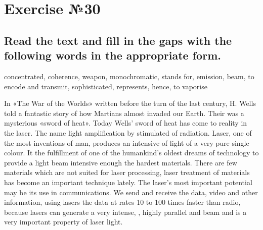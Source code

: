 \section{Exercise №30}
\subsection*{Read the text and fill in the gaps with the following words in the
      appropriate form.}
concentrated, coherence, weapon, monochromatic, stands for, emission, beam, to encode
and transmit, sophisticated, represents, hence, to vaporise

In «The War of the Worlds» written before the turn of the last century, H. Wells told
a fantastic story of how Martians almost invaded our Earth. Their 
\underline{\hspace{2cm}} was a mysterious «sword of heat». Today Wells’ sword of heat has come to
reality in the laser. The name \underline{\hspace{2cm}} light amplification by
stimulated \underline{\hspace{2cm}} of radiation. Laser, one of the most 
\underline{\hspace{2cm}} inventions of man, produces an intensive \underline{\hspace{2cm}} of light
of a very pure single colour. It \underline{\hspace{2cm}} the fulfillment of one
of the humankind’s oldest dreams of technology to provide a light beam intensive
enough \underline{\hspace{2cm}} the hardest materials. There are few materials which
are not suited for laser processing, \underline{\hspace{2cm}} laser treatment of
materials has become an important technique lately. The laser’s most important
potential may be its use in communications. We send and receive the data, video and
other information, using lasers \underline{\hspace{2cm}} the data at rates 10 to 100
times faster than radio, because lasers can generate a very intense, 
\underline{\hspace{2cm}}, highly parallel and \underline{\hspace{2cm}} beam and 
\underline{\hspace{2cm}} is a very important property of laser light.

